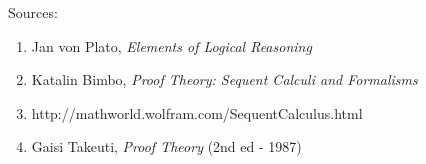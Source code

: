 \documentclass[article]{journal}
\begin{document}
\vskip 0.1in
Sources:
\begin{enumerate}
\item Jan von Plato, \textit{Elements of Logical Reasoning}
\item Katalin Bimbo, \textit{Proof Theory: Sequent Calculi and Formalisms}
\item http://mathworld.wolfram.com/SequentCalculus.html
\item Gaisi Takeuti, \textit{Proof Theory} (2nd ed - 1987)
\end{enumerate}
\end{document}
